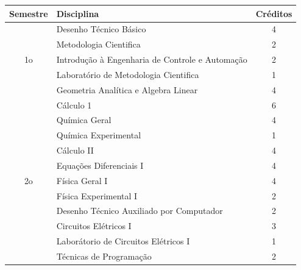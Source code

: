 \documentclass[12pt]{article} %
\begin{document}
\begin{table}[H]
\centering
\begin{tabular}{|c|l|c|}
\hline
Semestre             & Disciplina                                                 & Créditos \\ \hline
\multirow{5}{*}{1o}  
				   & Desenho Técnico Básico                                                  & 4        \\ \cline{2-3} 
                     & Metodologia Cientifica                                                     & 2        \\ \cline{2-3} 
                     & Introdução à Engenharia de Controle e Automação      & 2        \\ \cline{2-3} 
                     & Laboratório de Metodologia Cientifica						    & 1		\\ \cline{2-3} 
                     & Geometria Analítica e Algebra Linear                              & 4        \\ \cline{2-3} 
                     & Cálculo 1                                           								& 6       \\ \cline{2-3} 
                     & Química Geral																& 4       \\ \cline{2-3} 
                     & Química Experimental													& 1       \\ \hline
\multirow{5}{*}{2o}  
				   & Cálculo II                                                 & 4        \\ \cline{2-3} 
				   & Equações Diferenciais I                                                 & 4        \\ \cline{2-3} 
                     & Física Geral I                                          & 4        \\ \cline{2-3} 
                     & Física Experimental I                                      & 2        \\ \cline{2-3} 
                     & Desenho Técnico Auxiliado por Computador                   & 2        \\ \cline{2-3} 
                     & Circuitos Elétricos I                                     & 3        \\ \cline{2-3} 
                     & Laborátorio de Circuitos Elétricos I                                       & 1        \\ \cline{2-3} 
                     & Técnicas de Programação                   & 2         \\ \cline{2-3} 

\end{tabular}
\end{table}
\end{document}
